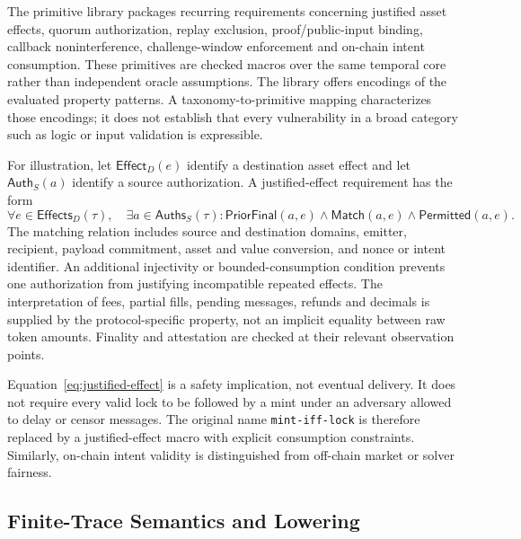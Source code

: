 \documentclass[journal]{IEEEtran}
\theoremstyle{definition}
\begin{document}
The primitive library packages recurring requirements concerning justified asset effects, quorum authorization, replay exclusion, proof/public-input binding, callback noninterference, challenge-window enforcement and on-chain intent consumption. These primitives are checked macros over the same temporal core rather than independent oracle assumptions. The library offers encodings of the evaluated property patterns. A taxonomy-to-primitive mapping characterizes those encodings; it does not establish that every vulnerability in a broad category such as logic or input validation is expressible.

For illustration, let $\mathsf{Effect}_D(e)$ identify a destination asset effect and let $\mathsf{Auth}_S(a)$ identify a source authorization. A justified-effect requirement has the form
\begin{equation}
\label{eq:justified-effect}
\forall e\in\mathsf{Effects}_D(\tau),\quad
\exists a\in\mathsf{Auths}_S(\tau):
\mathsf{PriorFinal}(a,e)\wedge\mathsf{Match}(a,e)
\wedge\mathsf{Permitted}(a,e).
\end{equation}
The matching relation includes source and destination domains, emitter, recipient, payload commitment, asset and value conversion, and nonce or intent identifier. An additional injectivity or bounded-consumption condition prevents one authorization from justifying incompatible repeated effects. The interpretation of fees, partial fills, pending messages, refunds and decimals is supplied by the protocol-specific property, not an implicit equality between raw token amounts. Finality and attestation are checked at their relevant observation points.

Equation~\eqref{eq:justified-effect} is a safety implication, not eventual delivery. It does not require every valid lock to be followed by a mint under an adversary allowed to delay or censor messages. The original name \texttt{mint-iff-lock} is therefore replaced by a justified-effect macro with explicit consumption constraints. Similarly, on-chain intent validity is distinguished from off-chain market or solver fairness.

\subsection{Finite-Trace Semantics and Lowering}
\end{document}
